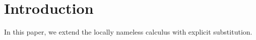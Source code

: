 
\section{Introduction}\label{sec:intro}

In this paper, we extend the locally nameless calculus with explicit
substitution.